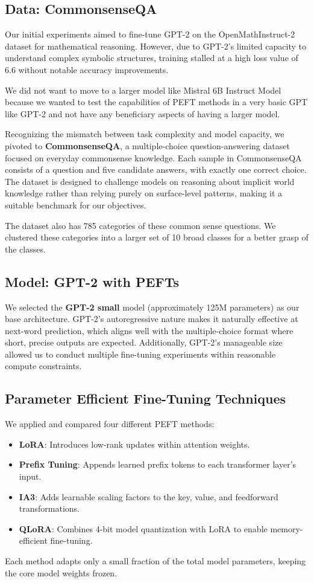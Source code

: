 \documentclass[11pt,twocolumn]{article}
\begin{document}
\subsection{Data: CommonsenseQA}
Our initial experiments aimed to fine-tune GPT-2 on the OpenMathInstruct-2 dataset for mathematical reasoning. However, due to GPT-2's limited capacity to understand complex symbolic structures, training stalled at a high loss value of 6.6 without notable accuracy improvements.

We did not want to move to a larger model like Mistral 6B Instruct Model because we wanted to test the capabilities of PEFT methods in a very basic GPT like GPT-2 and not have any beneficiary aspects of having a larger model.

Recognizing the mismatch between task complexity and model capacity, we pivoted to \textbf{CommonsenseQA}, a multiple-choice question-answering dataset focused on everyday commonsense knowledge. Each sample in CommonsenseQA consists of a question and five candidate answers, with exactly one correct choice. The dataset is designed to challenge models on reasoning about implicit world knowledge rather than relying purely on surface-level patterns, making it a suitable benchmark for our objectives.

The dataset also has 785 categories of these common sense questions. We clustered these categories into a larger set of 10 broad classes for a better grasp of the classes.

\subsection{Model: GPT-2 with PEFTs}
We selected the \textbf{GPT-2 small} model (approximately 125M parameters) as our base architecture. GPT-2's autoregressive nature makes it naturally effective at next-word prediction, which aligns well with the multiple-choice format where short, precise outputs are expected. Additionally, GPT-2's manageable size allowed us to conduct multiple fine-tuning experiments within reasonable compute constraints.

\subsection{Parameter Efficient Fine-Tuning Techniques}
We applied and compared four different PEFT methods:
\begin{itemize}
    \item \textbf{LoRA}: Introduces low-rank updates within attention weights.
    \item \textbf{Prefix Tuning}: Appends learned prefix tokens to each transformer layer’s input.
    \item \textbf{IA3}: Adds learnable scaling factors to the key, value, and feedforward transformations.
    \item \textbf{QLoRA}: Combines 4-bit model quantization with LoRA to enable memory-efficient fine-tuning.
\end{itemize}
Each method adapts only a small fraction of the total model parameters, keeping the core model weights frozen.
\end{document}
